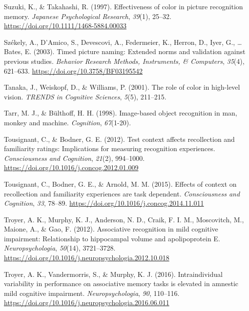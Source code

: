 \documentclass[
  11pt,
]{article}
\begin{document}
\leavevmode\hypertarget{ref-suzuki1997}{}%
Suzuki, K., \& Takahashi, R. (1997). Effectiveness of color in picture
recognition memory. \emph{Japanese Psychological Research},
\emph{39}(1), 25--32. \url{https://doi.org/10.1111/1468-5884.00033}

\leavevmode\hypertarget{ref-szekely2003}{}%
Székely, A., D'Amico, S., Devescovi, A., Federmeier, K., Herron, D.,
Iyer, G., \ldots{} Bates, E. (2003). Timed picture naming: Extended
norms and validation against previous studies. \emph{Behavior Research
Methods, Instruments, \& Computers}, \emph{35}(4), 621--633.
\url{https://doi.org/10.3758/BF03195542}

\leavevmode\hypertarget{ref-tanaka2001}{}%
Tanaka, J., Weiskopf, D., \& Williams, P. (2001). The role of color in
high-level vision. \emph{TRENDS in Cognitive Sciences}, \emph{5}(5),
211--215.

\leavevmode\hypertarget{ref-tarr1998}{}%
Tarr, M. J., \& Bülthoff, H. H. (1998). Image-based object recognition
in man, monkey and machine. \emph{Cognition}, \emph{67}(1-20).

\leavevmode\hypertarget{ref-tousignant2012}{}%
Tousignant, C., \& Bodner, G. E. (2012). Test context affects
recollection and familiarity ratings: Implications for measuring
recognition experiences. \emph{Consciousness and Cognition},
\emph{21}(2), 994--1000.
\url{https://doi.org/10.1016/j.concog.2012.01.009}

\leavevmode\hypertarget{ref-tousignant2015}{}%
Tousignant, C., Bodner, G. E., \& Arnold, M. M. (2015). Effects of
context on recollection and familiarity experiences are task dependent.
\emph{Consciousness and Cognition}, \emph{33}, 78--89.
\url{https://doi.org/10.1016/j.concog.2014.11.011}

\leavevmode\hypertarget{ref-troyer2012}{}%
Troyer, A. K., Murphy, K. J., Anderson, N. D., Craik, F. I. M.,
Moscovitch, M., Maione, A., \& Gao, F. (2012). Associative recognition
in mild cognitive impairment: Relationship to hippocampal volume and
apolipoprotein E. \emph{Neuropsychologia}, \emph{50}(14), 3721--3728.
\url{https://doi.org/10.1016/j.neuropsychologia.2012.10.018}

\leavevmode\hypertarget{ref-troyer2016}{}%
Troyer, A. K., Vandermorris, S., \& Murphy, K. J. (2016).
Intraindividual variability in performance on associative memory tasks
is elevated in amnestic mild cognitive impairment.
\emph{Neuropsychologia}, \emph{90}, 110--116.
\url{https://doi.org/10.1016/j.neuropsychologia.2016.06.011}
\end{document}

